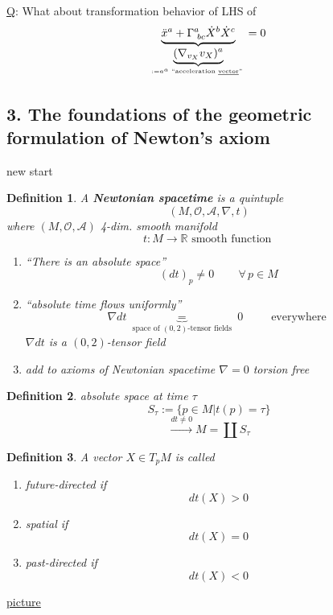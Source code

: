 \documentclass[10pt]{amsart}
\newtheorem{definition}{Definition}
\begin{document}
\begin{multicols*}{2}
	\underline{Q}: What about transformation behavior of LHS of 
	\[
	\underbrace{ \ddot{x}^a + \Gamma^a_{ \, \, bc } \dot{X}^b \dot{X}^c}_{ \underbrace{ (\nabla_{v_X}v_X)^a}_{ := a^a \text{ ``acceleration \underline{vector}'' } } } = 0
	\]
	
	\subsection*{3. The foundations of the geometric formulation of Newton's axiom}
	
	new start
	\begin{definition}
		A \textbf{Newtonian spacetime} is a quintuple \[
		(M , \mathcal{O}, \mathcal{A}, \nabla , t)
		\]
		where $(M,\mathcal{O}, \mathcal{A})$ 4-dim. smooth manifold
		\[
		t: M \to \mathbb{R} \text{ smooth function }
		\]
		
		\begin{enumerate}
			\item[(i)] ``There is an absolute space''
			\[
			(dt)_p \neq 0 \quad \quad \, \forall \, p \in M 
			\]
			\item[(ii)] ``absolute time flows uniformly''
			\[
			\nabla dt \underbrace{=}_{ \text{ space of $(0,2)$-tensor fields } }  0 \quad \quad \, \text{ everywhere }
			\]
			$\nabla dt $ is a $(0,2)$-tensor field
			\item[(iii)] add to axioms of Newtonian spacetime 
			$\nabla = 0$ torsion free
		\end{enumerate}
	\end{definition}
	
	\begin{definition}
		absolute space at time $\tau$ 
		\[
		S_{\tau} := \lbrace p\in M | t(p) = \tau \rbrace
		\]
		\[
		\xrightarrow{ dt \neq 0 } M = \coprod S_{\tau}
		\]
	\end{definition}
	
	\begin{definition} A vector $X \in T_p M$ is called 
		\begin{enumerate}
			\item[(a)] future-directed if 
			\[
			dt(X) > 0 
			\]
			\item[(b)] spatial if 
			\[
			dt(X) = 0 
			\]
			\item[(c)]
			past-directed if 
			\[
			dt(X) < 0
			\]
		\end{enumerate}
	\end{definition}
	
	\underline{picture}
	

\end{multicols*}
\end{document}
